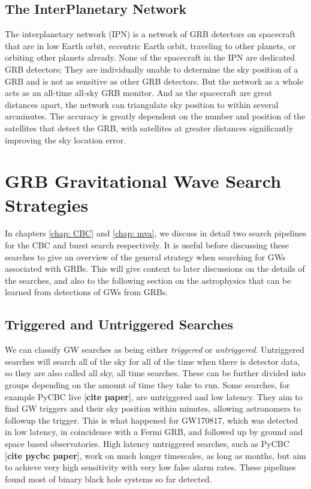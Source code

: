 \documentclass[11pt]{cuthesis}
\begin{document}
\subsection{The InterPlanetary Network}
The interplanetary network (IPN) is a network of GRB detectors on spacecraft that are in low Earth orbit, eccentric Earth orbit, traveling to other planets, or orbiting other planets already. None of the spacecraft in the IPN are dedicated GRB detectors; They are individually unable to determine the sky position of a GRB and is not as sensitive as other GRB detectors. But the network as a whole acts as an all-time all-sky GRB monitor. And as the spacecraft are great distances apart, the network can triangulate sky position to within several arcminutes. The accuracy is greatly dependent on the number and position of the satellites that detect the GRB, with satellites at greater distances significantly improving the sky location error.



\section{GRB Gravitational Wave Search Strategies}
In chapters \ref{chap: CBC} and \ref{chap: mva}, we discuss in detail two search pipelines for the CBC and burst search respectively. It is useful before discussing these searches to give an overview of the general strategy when searching for GWs associated with GRBs. This will give context to later discussions on the details of the searches, and also to the following section on the astrophysics that can be learned from detections of GWs from GRBs. 

\subsection{Triggered and Untriggered Searches}
We can classify GW searches as being either \textit{triggered} or \textit{untriggered}. Untriggered searches will search all of the sky for all of the time when there is detector data, so they are also called all sky, all time searches. These can be further divided into groups depending on the amount of time they take to run. Some searches, for example PyCBC live [\textbf{cite paper}], are untriggered and low latency. They aim to find GW triggers and their sky position within minutes, allowing astronomers to followup the trigger. This is what happened for GW170817, which was detected in low latency, in coincidence with a Fermi GRB, and followed up by ground and space based observatories. High latency untriggered  searches, such as PyCBC [\textbf{cite pycbc paper}], work on much longer timescales, as long as months, but aim to achieve very high sensitivity with very low false alarm rates. These pipelines found most of binary black hole systems so far detected. 
\end{document}
